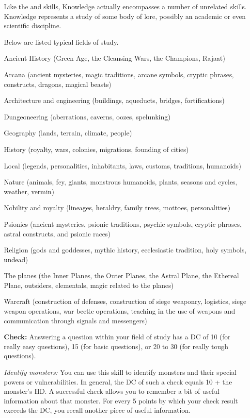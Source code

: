 Like the  and  skills, Knowledge actually encompasses a number of unrelated skills. Knowledge represents a study of some body of lore, possibly an academic or even scientific discipline.

Below are listed typical fields of study.

\begin{itemize*}
\item Ancient History (Green Age, the Cleansing Wars, the Champions, Rajaat)
\item Arcana (ancient mysteries, magic traditions, arcane symbols, cryptic phrases, constructs, dragons, magical beasts)
\item Architecture and engineering (buildings, aqueducts, bridges, fortifications)
\item Dungeoneering (aberrations, caverns, oozes, spelunking)
\item Geography (lands, terrain, climate, people)
\item History (royalty, wars, colonies, migrations, founding of cities)
\item Local (legends, personalities, inhabitants, laws, customs, traditions, humanoids)
\item Nature (animals, fey, giants, monstrous humanoids, plants, seasons and cycles, weather, vermin)
\item Nobility and royalty (lineages, heraldry, family trees, mottoes, personalities)
\item Psionics (ancient mysteries, psionic traditions, psychic symbols, cryptic phrases, astral constructs, and psionic races)
\item Religion (gods and goddesses, mythic history, ecclesiastic tradition, holy symbols, undead)
\item The planes (the Inner Planes, the Outer Planes, the Astral Plane, the Ethereal Plane, outsiders, elementals, magic related to the planes)
\item Warcraft (construction of defenses, construction of siege weaponry, logistics, siege weapon operations, war beetle operations, teaching in the use of weapons and communication through signals and messengers)
\end{itemize*}

\textbf{Check:} Answering a question within your field of study has a DC of 10 (for really easy questions), 15 (for basic questions), or 20 to 30 (for really tough questions).

\textit{Identify monsters:} You can use this skill to identify monsters and their special powers or vulnerabilities. In general, the DC of such a check equals 10 + the monster's HD. A successful check allows you to remember a bit of useful information about that monster. For every 5 points by which your check result exceeds the DC, you recall another piece of useful information.

